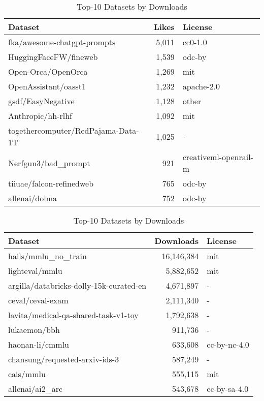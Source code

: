 \begin{table}[t]
\caption{Top-10 Datasets by Likes}
\label{tab:top_datasets_likes}
\begin{tabular}{lrl}
\hline
\textbf{Dataset} & \textbf{Likes} & \textbf{License} \\ \hline
fka/awesome-chatgpt-prompts & 5,011 & cc0-1.0 \\
HuggingFaceFW/fineweb & 1,539 & odc-by \\
Open-Orca/OpenOrca & 1,269 & mit \\
OpenAssistant/oasst1 & 1,232 & apache-2.0 \\
gsdf/EasyNegative & 1,128 & other \\
Anthropic/hh-rlhf & 1,092 & mit \\
togethercomputer/RedPajama-Data-1T & 1,025 & - \\
Nerfgun3/bad\_prompt & 921 & creativeml-openrail-m \\
tiiuae/falcon-refinedweb & 765 & odc-by \\
allenai/dolma & 752 & odc-by \\ \hline
\end{tabular}%

\bigskip

\caption{Top-10 Datasets by Downloads}
\label{tab:top_datasets_downloads}
\begin{tabular}{lrl}
\hline
\textbf{Dataset} & \textbf{Downloads} & \textbf{License} \\ \hline
hails/mmlu\_no\_train & 16,146,384 & mit \\
lighteval/mmlu & 5,882,652 & mit \\
argilla/databricks-dolly-15k-curated-en & 4,671,897 & - \\
ceval/ceval-exam & 2,111,340 & - \\
lavita/medical-qa-shared-task-v1-toy & 1,792,638 & - \\
lukaemon/bbh & 911,736 & - \\
haonan-li/cmmlu & 633,608 & cc-by-nc-4.0 \\
chansung/requested-arxiv-ids-3 & 587,249 & - \\
cais/mmlu & 555,115 & mit \\
allenai/ai2\_arc & 543,678 & cc-by-sa-4.0 \\ \hline
\end{tabular}%
\end{table}


